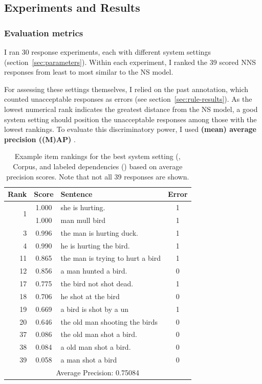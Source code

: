 \subsection{Experiments and Results}
\subsubsection{Evaluation metrics}
\label{sec:metrics}

I ran 30 response experiments, each with different system settings
(section~\ref{sec:parameters}). Within each experiment, I ranked the 39
scored NNS responses from least to most similar to the NS model.

For assessing these settings themselves, I relied on the past annotation, which counted unacceptable responses as errors (see section~\ref{sec:rule-results}).  As the lowest numerical rank indicates the greatest distance from the NS model, a good system setting should position the unacceptable responses among those with the lowest rankings.
To evaluate this discriminatory power, I used \textbf{(mean) average precision ((M)AP)}
\citep[][ch. 8]{manning-et-al:08}.

\begin{table}[htb!]
\begin{center}
\setlength{\tabcolsep}{0.3em}
\begin{tabular}{|r|c|l|c|}
\hline
Rank & Score & Sentence & Error \\
\hline
\hline
\multirow{2}{*}{1} & 1.000 & she is hurting. & 1 \\
& 1.000 & man mull bird & 1 \\
\hline
3 & 0.996 & the man is hurting duck. & 1 \\
4 & 0.990 & he is hurting the bird. & 1 \\
\hline
11 & 0.865 & the man is trying to hurt a bird & 1 \\
12 & 0.856 & a man hunted a bird. & 0 \\
\hline
17 & 0.775 & the bird not shot dead.  & 1 \\
18 & 0.706 & he shot at the bird & 0 \\
19 & 0.669 & a bird is shot by a un & 1 \\
20 & 0.646 & the old man shooting the birds & 0 \\
\hline
37 & 0.086 & the old man shot a bird. & 0 \\
38 & 0.084 & a old man shot a bird. & 0 \\
39 & 0.058 & a man shot a bird & 0 \\
\hline
\hline
\multicolumn{4}{|c|}{Average Precision: 0.75084} \\
\hline
\end{tabular}
\caption{Example item rankings for the best system setting (,  Corpus, and labeled dependencies () based on average precision scores. Note that not all 39 responses are shown.}
\label{tab:i10responses-avgprec}
\end{center}
\end{table}


